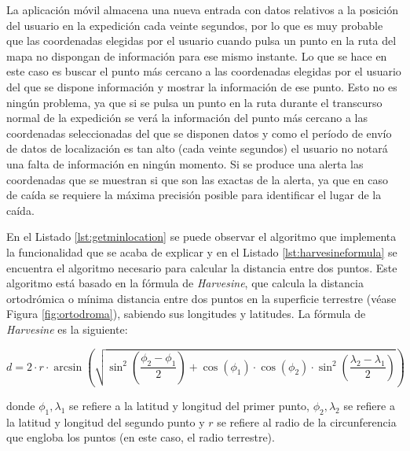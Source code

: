 La aplicación móvil almacena una nueva entrada con datos relativos a la posición del usuario en la expedición cada veinte segundos, por lo que es muy probable que las coordenadas elegidas por el usuario cuando pulsa un punto en la ruta del mapa no dispongan de información para ese mismo instante. Lo que se hace en este caso es buscar el punto más cercano a las coordenadas elegidas por el usuario del que se dispone información y mostrar la información de ese punto. Esto no es ningún problema, ya que si se pulsa un punto en la ruta durante el transcurso normal de la expedición se verá la información del punto más cercano a las coordenadas seleccionadas del que se disponen datos y como el período de envío de datos de localización es tan alto (cada veinte segundos) el usuario no notará una falta de información en ningún momento. Si se produce una alerta las coordenadas que se muestran si que son las exactas de la alerta, ya que en caso de caída se requiere la máxima precisión posible para identificar el lugar de la caída.

En el Listado \ref{lst:getminlocation} se puede observar el algoritmo que implementa la funcionalidad que se acaba de explicar y en el Listado \ref{lst:harvesineformula} se encuentra el algoritmo necesario para calcular la distancia entre dos puntos. Este algoritmo está basado en la fórmula de \textit{Harvesine}, que calcula la distancia ortodrómica o mínima distancia entre dos puntos en la superficie terrestre (véase Figura \ref{fig:ortodroma}), sabiendo sus longitudes y latitudes. La fórmula de \textit{Harvesine} es la siguiente:

\begin{equation}
d = 2\cdot r \cdot \arcsin{\left( \sqrt{\sin^2\left(\frac{\phi_2 - \phi_1}{2} \right) + \cos \left( \phi_1 \right) \cdot \cos \left( \phi_2 \right) \cdot \sin^2 \left( \frac{\lambda_2 - \lambda_1}{2} \right)}\right)}
\end{equation}

donde $\phi_1, \lambda_1$ se refiere a la latitud y longitud del primer punto, $\phi_2, \lambda_2$ se refiere a la latitud y longitud del segundo punto y $r$ se refiere al radio de la circunferencia que engloba los puntos (en este caso, el radio terrestre).

